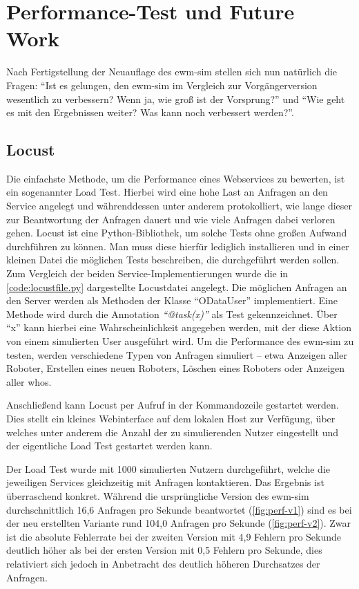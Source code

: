 \chapter{Performance-Test und Future Work}
Nach Fertigstellung der Neuauflage des \ac{ewm-sim} stellen sich nun natürlich die Fragen: \enquote{Ist es gelungen, den \ac{ewm-sim} im Vergleich zur Vorgängerversion wesentlich zu verbessern? Wenn ja, wie groß ist der Vorsprung?} und \enquote{Wie geht es mit den Ergebnissen weiter? Was kann noch verbessert werden?}.

\section{Locust}
Die einfachste Methode, um die Performance eines Webservices zu bewerten, ist ein sogenannter Load Test.
Hierbei wird eine hohe Last an Anfragen an den Service angelegt und währenddessen unter anderem protokolliert, wie lange dieser zur Beantwortung der Anfragen dauert und wie viele Anfragen dabei verloren gehen.
Locust ist eine Python-Bibliothek, um solche Tests ohne großen Aufwand durchführen zu können.
Man muss diese hierfür lediglich installieren und in einer kleinen Datei die möglichen Tests beschreiben, die durchgeführt werden sollen.
Zum Vergleich der beiden Service-Implementierungen wurde die in \autoref{code:locustfile.py} dargestellte Locustdatei angelegt.
Die möglichen Anfragen an den Server werden als Methoden der Klasse \enquote{ODataUser} implementiert.
Eine Methode wird durch die Annotation \emph{\enquote{@task(x)}} als Test gekennzeichnet.
Über \enquote{x} kann hierbei eine Wahrscheinlichkeit angegeben werden, mit der diese Aktion von einem simulierten User ausgeführt wird.
Um die Performance des \ac{ewm-sim} zu testen, werden verschiedene Typen von Anfragen simuliert -- etwa Anzeigen aller Roboter, Erstellen eines neuen Roboters, Löschen eines Roboters oder Anzeigen aller \ac{who}s.



Anschließend kann Locust per Aufruf in der Kommandozeile gestartet werden.
Dies stellt ein kleines Webinterface auf dem lokalen Host zur Verfügung, über welches unter anderem die Anzahl der zu simulierenden Nutzer eingestellt und der eigentliche Load Test gestartet werden kann.

Der Load Test wurde mit 1000 simulierten Nutzern durchgeführt, welche die jeweiligen Services gleichzeitig mit Anfragen kontaktieren.
Das Ergebnis ist überraschend konkret.
Während die ursprüngliche Version des \ac{ewm-sim} durchschnittlich 16,6 Anfragen pro Sekunde beantwortet (\autoref{fig:perf-v1}) sind es bei der neu erstellten Variante rund 104,0 Anfragen pro Sekunde (\autoref{fig:perf-v2}).
Zwar ist die absolute Fehlerrate bei der zweiten Version mit 4,9 Fehlern pro Sekunde deutlich höher als bei der ersten Version mit 0,5 Fehlern pro Sekunde, dies relativiert sich jedoch in Anbetracht des deutlich höheren Durchsatzes der Anfragen.


